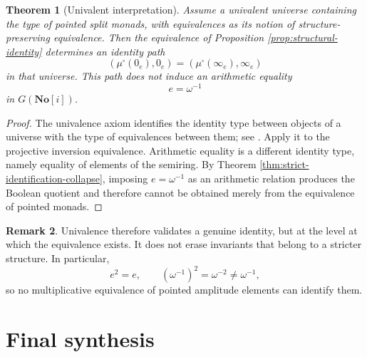 \documentclass[11pt]{amsart}
\numberwithin{equation}{section}
\newtheorem{theorem}{Theorem}[section]
\theoremstyle{definition}
\newtheorem{remark}[theorem]{Remark}
\newcommand{\No}{\mathbf{No}}
\begin{document}
\begin{theorem}[Univalent interpretation]\label{thm:univalent-interpretation}
Assume a univalent universe containing the type of pointed split monads, with equivalences as its notion of structure-preserving equivalence.  Then the equivalence of Proposition \ref{prop:structural-identity} determines an identity path
\[
(\mu^\square(0_e),0_e)
=
(\mu^\square(\infty_e),\infty_e)
\]
in that universe.  This path does not induce an arithmetic equality
\[
e=\omega^{-1}
\]
in $G(\No[i])$.
\end{theorem}

\begin{proof}
The univalence axiom identifies the identity type between objects of a universe with the type of equivalences between them; see \cite{HoTT}.  Apply it to the projective inversion equivalence.  Arithmetic equality is a different identity type, namely equality of elements of the semiring.  By Theorem \ref{thm:strict-identification-collapse}, imposing $e=\omega^{-1}$ as an arithmetic relation produces the Boolean quotient and therefore cannot be obtained merely from the equivalence of pointed monads.
\end{proof}

\begin{remark}
Univalence therefore validates a genuine identity, but at the level at which the equivalence exists.  It does not erase invariants that belong to a stricter structure.  In particular,
\[
e^2=e,
\qquad
(\omega^{-1})^2=\omega^{-2}\neq\omega^{-1},
\]
so no multiplicative equivalence of pointed amplitude elements can identify them.
\end{remark}

\section{Final synthesis}
\end{document}
